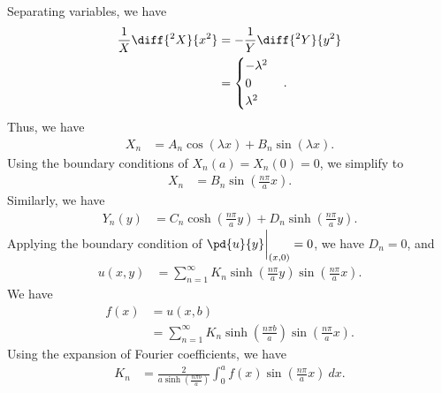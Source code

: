 \documentclass[10pt]{mypackage}
\begin{document}
\begin{solution}[12.5, Problem 2]
  Separating variables, we have
  \begin{align*}
    \frac{1}{X}\diff{^2X}{x^2} &= -\frac{1}{Y}\diff{^2Y}{y^2}\\
                               &= \begin{cases}
                                 -\lambda^2\\
                                 0\\
                                 \lambda^2
                               \end{cases}.
  \end{align*}
  Thus, we have
  \begin{align*}
    X_n &= A_n\cos\left( \lambda x \right) + B_n\sin\left( \lambda x \right).
  \end{align*}
  Using the boundary conditions of $X_n(a) = X_n(0) = 0$, we simplify to
  \begin{align*}
    X_n &= B_n\sin\left( \frac{n\pi}{a}x \right).
  \end{align*}
  Similarly, we have
  \begin{align*}
    Y_n(y) &= C_n\cosh\left( \frac{n\pi}{a}y \right) + D_n\sinh\left( \frac{n\pi}{a}y \right).
  \end{align*}
  Applying the boundary condition of $\pd{u}{y}\biggr\vert_{(x,0)} = 0$, we have $D_n = 0$, and
  \begin{align*}
    u(x,y) &= \sum_{n=1}^{\infty}K_n\sinh\left( \frac{n\pi}{a}y \right) \sin\left( \frac{n\pi}{a}x \right).
  \end{align*}
  We have
  \begin{align*}
    f(x) &= u\left( x,b \right)\\
         &= \sum_{n=1}^{\infty}K_n\sinh\left( \frac{n\pi b}{a} \right)\sin\left( \frac{n\pi}{a}x \right).
  \end{align*}
  Using the expansion of Fourier coefficients, we have
  \begin{align*}
    K_n &= \frac{2}{a\sinh\left( \frac{n\pi b}{a} \right)} \int_{0}^{a} f(x)\sin\left( \frac{n\pi}{a}x \right)\:dx.
  \end{align*}
\end{solution}
\end{document}
